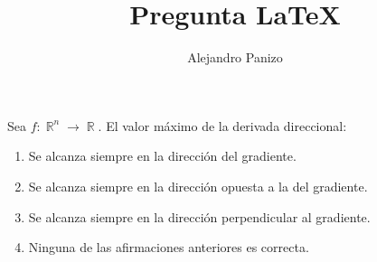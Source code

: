 \documentclass[10pt,spanish,hyperref={pdfpagelabels=false}]{beamer}
\author{Alejandro Panizo}
\title{Pregunta \LaTeX}
\DeclareMathOperator{\RR}{\mathbb{R}}
\begin{document}
\Large

\rightskip=0pt

\begin{frame}

Sea $f:\RR^n \to \RR $. El valor m\'{a}ximo de la derivada direccional:

\medskip

\begin{enumerate}[1.] \rightskip=0pt
\item  Se alcanza siempre en la direcci\'{o}n del gradiente.
\item Se alcanza siempre en la direcci\'{o}n opuesta a la del gradiente.
\item  Se alcanza siempre en la direcci\'{o}n perpendicular al gradiente.
\item   Ninguna de las  afirmaciones anteriores es co\-rrecta.
\end{enumerate}


\end{frame}
\end{document}
